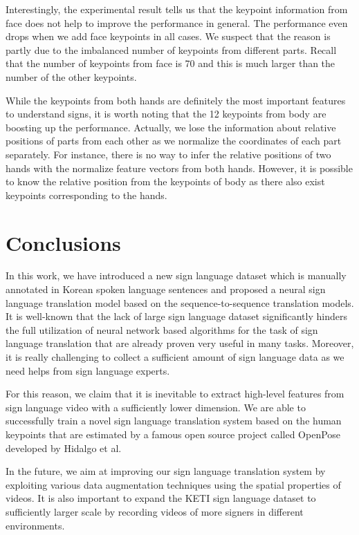 \documentclass[10pt,twocolumn,letterpaper]{article}
\begin{document}
Interestingly, the experimental result tells us that the keypoint information from face does not help to improve the performance in general. The performance even drops when we add face keypoints in all cases. We suspect that the reason is partly due to the imbalanced number of keypoints from different parts. Recall that the number of keypoints from face is 70 and this is much larger than the number of the other keypoints.

While the keypoints from both hands are definitely the most important features to understand signs, it is worth noting that the 12 keypoints from body are boosting up the performance. Actually, we lose the information about relative positions of parts from each other as we normalize the coordinates of each part separately. For instance, there is no way to infer the relative positions of two hands with the normalize feature vectors from both hands. However, it is possible to know the relative position from the keypoints of body as there also exist keypoints corresponding to the hands.

\section{Conclusions}
In this work, we have introduced a new sign language dataset which is manually annotated in Korean spoken language sentences and proposed a neural sign language translation model based on the sequence-to-sequence translation models. It is well-known that the lack of large sign language dataset significantly hinders the full utilization of neural network based algorithms for the task of sign language translation that are already proven very useful in many tasks. Moreover, it is really challenging to collect a sufficient amount of sign language data as we need helps from sign language experts. 

For this reason, we claim that it is inevitable to extract high-level features from sign language video with a sufficiently lower dimension. We are able to successfully train a novel sign language translation system based on the human keypoints that are estimated by a famous open source project called OpenPose developed by Hidalgo et al. 

In the future, we aim at improving our sign language translation system by exploiting various data augmentation techniques using the spatial properties of videos. It is also important to expand the KETI sign language dataset to sufficiently larger scale by recording videos of more signers in different environments.
\end{document}
